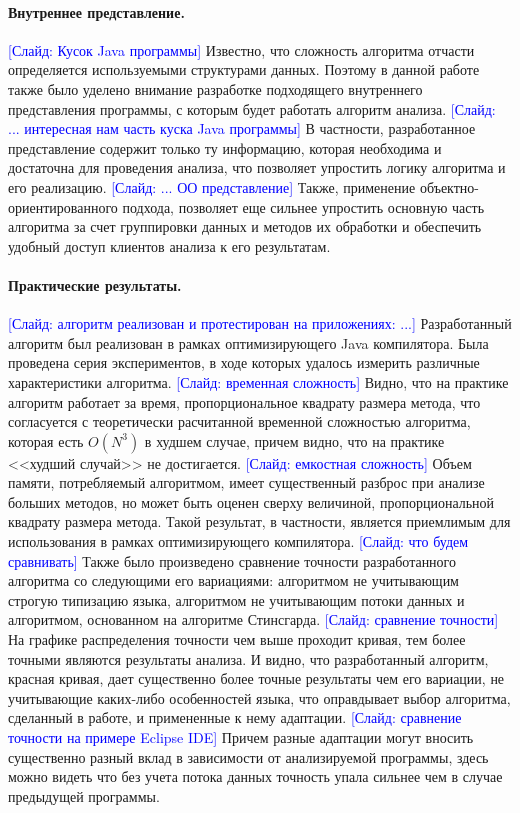 \documentclass[12pt]{article}
\newcommand{\slide}[1]{\textcolor{Blue}{[Слайд: #1]}}
\begin{document}
  \paragraph{Внутреннее представление.}
  \slide{Кусок Java программы}
  Известно, что сложность алгоритма отчасти определяется используемыми
  структурами данных. Поэтому в данной работе также было уделено внимание
  разработке подходящего внутреннего представления программы, с которым будет
  работать алгоритм анализа.
  \slide{... интересная нам часть куска Java программы}
  В частности, разработанное представление содержит только ту информацию,
  которая необходима и достаточна для проведения анализа, что позволяет
  упростить логику алгоритма и его реализацию.
  \slide{... ОО представление}
  Также, применение объектно-ориентированного подхода, позволяет еще сильнее
  упростить основную часть алгоритма за счет группировки данных и методов их
  обработки и обеспечить удобный доступ клиентов анализа к его результатам.

  \paragraph{Практические результаты.}
  \slide{алгоритм реализован и протестирован на приложениях: ...}
  Разработанный алгоритм был реализован в рамках оптимизирующего Java
  компилятора. Была проведена серия экспериментов, в ходе которых удалось
  измерить различные характеристики алгоритма.
  \slide{временная сложность}
  Видно, что на практике алгоритм работает за время, пропорциональное
  квадрату размера метода, что согласуется с теоретически расчитанной
  временной сложностью алгоритма, которая есть $O(N^3)$ в худшем случае,
  причем видно, что на практике <<худший случай>> не достигается.
  \slide{емкостная сложность}
  Объем памяти, потребляемый алгоритмом, имеет существенный разброс при анализе
  больших методов, но может быть оценен сверху величиной, пропорциональной
  квадрату размера метода. Такой результат, в частности, является приемлимым
  для использования в рамках оптимизирующего компилятора.
  \slide{что будем сравнивать}
  Также было произведено сравнение точности разработанного алгоритма со
  следующими его вариациями: алгоритмом не учитывающим строгую типизацию языка,
  алгоритмом не учитывающим потоки данных и алгоритмом, основанном на алгоритме
  Стинсгарда.
  \slide{сравнение точности}
  На графике распределения точности чем выше проходит кривая, тем
  более точными являются результаты анализа. И видно, что разработанный
  алгоритм, красная кривая, дает существенно более точные результаты чем
  его вариации, не учитывающие каких-либо особенностей языка, что
  оправдывает выбор алгоритма, сделанный в работе, и примененные к нему
  адаптации.
  \slide{сравнение точности на примере Eclipse IDE}
  Причем разные адаптации могут вносить существенно разный вклад в зависимости
  от анализируемой программы, здесь можно видеть что без учета потока данных
  точность упала сильнее чем в случае предыдущей программы.
\end{document}

